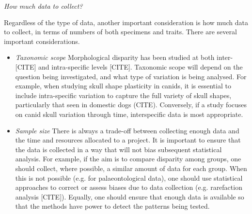 \documentclass[12pt,letterpaper]{article}
\renewcommand{\subsection}[1]{%
\bigskip
\begin{center}
\begin{large}
\normalfont\itshape #1
\end{large}
\end{center}}
\begin{document}
\subsection{How much data to collect?}
Regardless of the type of data, another important consideration is how much data to collect, in terms of numbers of both specimens and traits.
There are several important considerations.
\begin{itemize}
    \item \textit{Taxonomic scope}
    Morphological disparity has been studied at both inter-[CITE] and intra-specific levels [CITE].
    Taxonomic scope will depend on the question being investigated, and what type of variation is being analysed.
    For example, when studying skull shape plasticity in canids, it is essential to include intra-specific variation to capture the full variety of skull shapes, particularly that seen in domestic dogs (CITE).
    Conversely, if a study focuses on canid skull variation through time, interspecific data is most appropriate.
    \item \textit{Sample size}
    There is always a trade-off between collecting enough data and the time and resources allocated to a project.
    It is important to ensure that the data is collected in a way that will not bias subsequent statistical analysis.
    For example, if the aim is to compare disparity among groups, one should collect, where possible, a similar amount of data for each group.
    When this is not possible (e.g. for palaeontological data), one should use statistical approaches to correct or assess biases due to data collection (e.g. rarefaction analysis [CITE]).
    Equally, one should ensure that enough data is available so that the methods have power to detect the patterns being tested.
\end{itemize}
\end{document}
